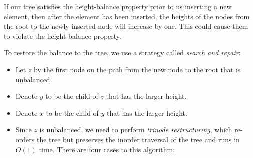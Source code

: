 If our tree satisfies the height-balance property prior to us inserting a new
element, then after the element has been inserted, the heights of the nodes from
the root to the newly inserted node will increase by one. This could cause them
to violate the height-balance property.

To restore the balance to the tree, we use a strategy called \textit{search and
repair}:

\begin{itemize}
  \item Let $z$ by the first node on the path from the new node to the root that
    is unbalanced.
  \item Denote $y$ to be the child of $z$ that has the larger height.
  \item Denote $x$ to be the child of $y$ that has the larger height.
  \item Since $z$ is unbalanced, we need to perform \textit{trinode
  restructuring}, which re-orders the tree but preserves the inorder traversal
  of the tree and runs in $O(1)$ time. There are four cases to this algorithm:
\end{itemize}
